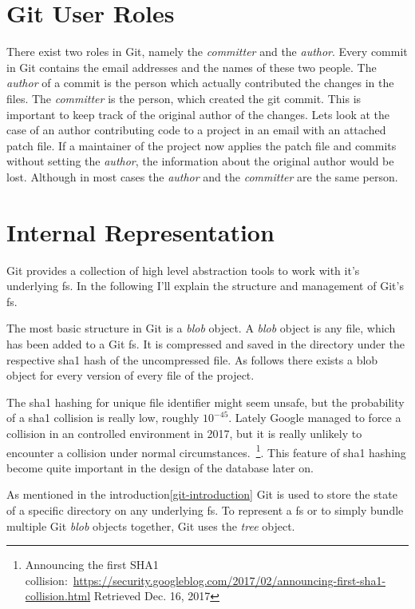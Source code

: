 \section{Git User Roles}
There exist two roles in Git, namely the \emph{committer} and the \emph{author}.
Every commit in Git contains the email addresses and the names of these two people.
The \emph{author} of a commit is the person which actually contributed the changes in the files.
The \emph{committer} is the person, which created the git commit.
This is important to keep track of the original author of the changes.
Lets look at the case of an author contributing code to a project in an email with an attached patch file.
If a maintainer of the project now applies the patch file and commits without setting the \emph{author}, the information about the original author would be lost.
Although in most cases the \emph{author} and the \emph{committer} are the same person. 


\section{Internal Representation}
Git provides a collection of high level abstraction tools to work with it's underlying \ac{fs}.
In the following I'll explain the structure and management of Git's \ac{fs}.

The most basic structure in Git is a \emph{blob} object.
A \emph{blob} object is any file, which has been added to a Git \ac{fs}.
It is compressed and saved in the  directory under the respective \ac{sha1} hash of the uncompressed file.
As follows there exists a blob object for every version of every file of the project.

The \ac{sha1} hashing for unique file identifier might seem unsafe, but the probability of a \ac{sha1} collision is really low, roughly $10^{-45}$.
Lately Google managed to force a collision in an controlled environment in 2017, but it is really unlikely to encounter a collision under normal circumstances.~\footnote{Announcing the first SHA1 collision:~\url{https://security.googleblog.com/2017/02/announcing-first-sha1-collision.html} Retrieved Dec. 16, 2017}.
This feature of \ac{sha1} hashing become quite important in the design of the database later on.

As mentioned in the introduction\ref{git-introduction} Git is used to store the state of a specific directory on any underlying \ac{fs}.
To represent a \ac{fs} or to simply bundle multiple Git \emph{blob} objects together, Git uses the \emph{tree} object.

